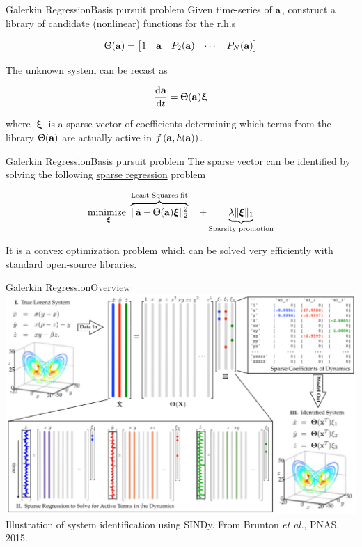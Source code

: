 \documentclass[usenames,dvipsnames,svgnames,10pt,aspectratio=169]{beamer}
\DeclareMathOperator*{\minimize}{minimize~}
\begin{document}
\begin{frame}[t, c]{Galerkin Regression}{Basis pursuit problem}
	Given time-series of ${\bf a}$, construct a library of candidate (nonlinear) functions for the r.h.s

	$$
	{\Uptheta}({\bf a}) = \begin{bmatrix}
											1 & {\bf a} & P_2({\bf a}) & \cdots & P_N({\bf a})
										\end{bmatrix}
	$$

	\bigskip

	The unknown system can be recast as

	$$
	\displaystyle \frac{\mathrm{d}{\bf a}}{\mathrm{d}t} = {\Uptheta}({\bf a}) {\boldsymbol \upxi}
	$$

	where ${\boldsymbol \upxi}$ is a sparse vector of coefficients determining which terms from the library $\Uptheta({\bf a})$ are actually active in $f\left({\bf a}, h({\bf a})\right)$.

	\vspace{1cm}
\end{frame}

\begin{frame}[t, c]{Galerkin Regression}{Basis pursuit problem}
	The sparse vector can be identified by solving the following \underline{sparse regression} problem

	\begin{equation}
		\minimize_{\boldsymbol \xi} \overbrace{\| \dot{\bf a} - \Uptheta({\bf a}){\boldsymbol \xi} \|_2^2}^{\text{Least-Squares fit}} \quad + \underbrace{\lambda \| {\boldsymbol \xi} \|_1}_{\text{Sparsity promotion}}
		\notag
	\end{equation}

	It is a convex optimization problem which can be solved very efficiently with standard open-source libraries.
\end{frame}

\begin{frame}[t, c]{Galerkin Regression}{Overview}
	\centering
	\includegraphics[width=.66\columnwidth]{sparse_identification} \\

	{\tiny Illustration of system identification using SINDy. From Brunton \emph{et al.}, PNAS, 2015.}
	\vspace{1cm}
\end{frame}
\end{document}
